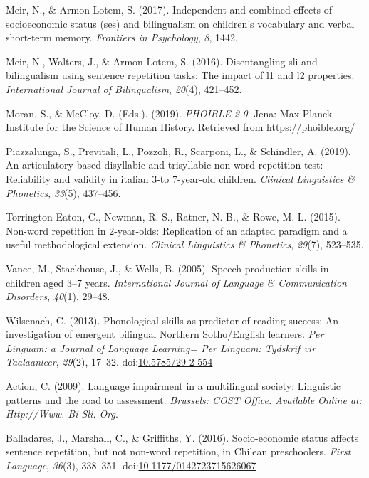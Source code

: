 \documentclass[english,,man,floatsintext]{apa6}
\begin{document}
\hypertarget{ref-meir2017independent}{}
Meir, N., \& Armon-Lotem, S. (2017). Independent and combined effects of
socioeconomic status (ses) and bilingualism on children's vocabulary and
verbal short-term memory. \emph{Frontiers in Psychology}, \emph{8},
1442.

\hypertarget{ref-meir2016disentangling}{}
Meir, N., Walters, J., \& Armon-Lotem, S. (2016). Disentangling sli and
bilingualism using sentence repetition tasks: The impact of l1 and l2
properties. \emph{International Journal of Bilingualism}, \emph{20}(4),
421--452.

\hypertarget{ref-phoible}{}
Moran, S., \& McCloy, D. (Eds.). (2019). \emph{PHOIBLE 2.0}. Jena: Max
Planck Institute for the Science of Human History. Retrieved from
\url{https://phoible.org/}

\hypertarget{ref-piazzalunga2019articulatory}{}
Piazzalunga, S., Previtali, L., Pozzoli, R., Scarponi, L., \& Schindler,
A. (2019). An articulatory-based disyllabic and trisyllabic non-word
repetition test: Reliability and validity in italian 3-to 7-year-old
children. \emph{Clinical Linguistics \& Phonetics}, \emph{33}(5),
437--456.

\hypertarget{ref-torrington2015non}{}
Torrington Eaton, C., Newman, R. S., Ratner, N. B., \& Rowe, M. L.
(2015). Non-word repetition in 2-year-olds: Replication of an adapted
paradigm and a useful methodological extension. \emph{Clinical
Linguistics \& Phonetics}, \emph{29}(7), 523--535.

\hypertarget{ref-vance2005speech}{}
Vance, M., Stackhouse, J., \& Wells, B. (2005). Speech-production skills
in children aged 3--7 years. \emph{International Journal of Language \&
Communication Disorders}, \emph{40}(1), 29--48.

\hypertarget{ref-wilsenach2013phonological}{}
Wilsenach, C. (2013). Phonological skills as predictor of reading
success: An investigation of emergent bilingual Northern Sotho/English
learners. \emph{Per Linguam: a Journal of Language Learning= Per
Linguam: Tydskrif vir Taalaanleer}, \emph{29}(2), 17--32.
doi:\href{https://doi.org/10.5785/29-2-554}{10.5785/29-2-554}

\hypertarget{ref-is08042009language}{}
Action, C. (2009). Language impairment in a multilingual society:
Linguistic patterns and the road to assessment. \emph{Brussels: COST
Office. Available Online at: Http://Www. Bi-Sli. Org}.

\hypertarget{ref-balladares2016socio}{}
Balladares, J., Marshall, C., \& Griffiths, Y. (2016). Socio-economic
status affects sentence repetition, but not non-word repetition, in
Chilean preschoolers. \emph{First Language}, \emph{36}(3), 338--351.
doi:\href{https://doi.org/10.1177/0142723715626067}{10.1177/0142723715626067}
\end{document}
